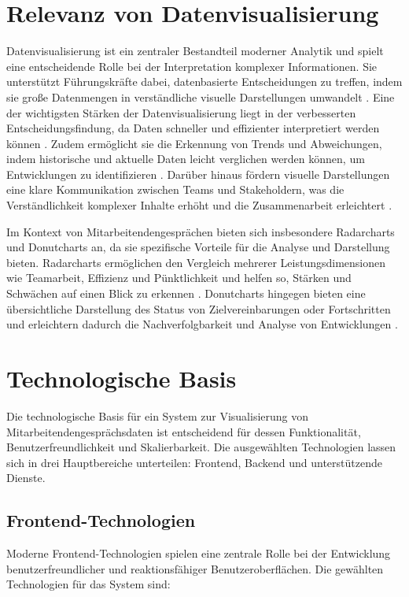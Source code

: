 \section{Relevanz von Datenvisualisierung}
Datenvisualisierung ist ein zentraler Bestandteil moderner Analytik und spielt eine entscheidende Rolle bei der Interpretation komplexer Informationen. Sie unterstützt Führungskräfte dabei, datenbasierte Entscheidungen zu treffen, indem sie große Datenmengen in verständliche visuelle Darstellungen umwandelt \cite{kirk2016data}. Eine der wichtigsten Stärken der Datenvisualisierung liegt in der verbesserten Entscheidungsfindung, da Daten schneller und effizienter interpretiert werden können \cite{kirk2016data}. Zudem ermöglicht sie die Erkennung von Trends und Abweichungen, indem historische und aktuelle Daten leicht verglichen werden können, um Entwicklungen zu identifizieren \cite{ware2012information}. Darüber hinaus fördern visuelle Darstellungen eine klare Kommunikation zwischen Teams und Stakeholdern, was die Verständlichkeit komplexer Inhalte erhöht und die Zusammenarbeit erleichtert \cite{evergreen2016effective}.

Im Kontext von Mitarbeitendengesprächen bieten sich insbesondere Radarcharts und Donutcharts an, da sie spezifische Vorteile für die Analyse und Darstellung bieten. Radarcharts ermöglichen den Vergleich mehrerer Leistungsdimensionen wie Teamarbeit, Effizienz und Pünktlichkeit und helfen so, Stärken und Schwächen auf einen Blick zu erkennen \cite{heikkila2018}. Donutcharts hingegen bieten eine übersichtliche Darstellung des Status von Zielvereinbarungen oder Fortschritten und erleichtern dadurch die Nachverfolgbarkeit und Analyse von Entwicklungen \cite{evergreen2016effective}.


\section{Technologische Basis}
Die technologische Basis für ein System zur Visualisierung von Mitarbeitendengesprächsdaten ist entscheidend für dessen Funktionalität, Benutzerfreundlichkeit und Skalierbarkeit. Die ausgewählten Technologien lassen sich in drei Hauptbereiche unterteilen: Frontend, Backend und unterstützende Dienste.

\subsection*{Frontend-Technologien}
Moderne Frontend-Technologien spielen eine zentrale Rolle bei der Entwicklung benutzerfreundlicher und reaktionsfähiger Benutzeroberflächen. Die gewählten Technologien für das System sind:

